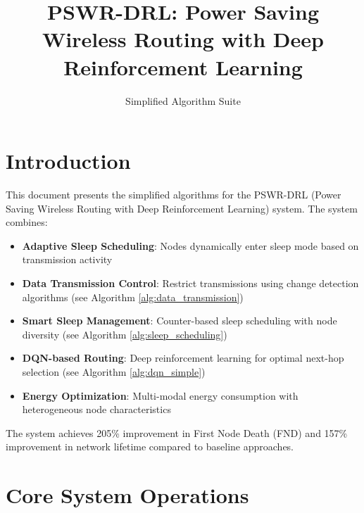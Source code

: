 \documentclass{article}
\begin{document}
\title{PSWR-DRL: Power Saving Wireless Routing with Deep Reinforcement Learning}
\author{Simplified Algorithm Suite}
\maketitle

\section{Introduction}

This document presents the simplified algorithms for the PSWR-DRL (Power Saving Wireless Routing with Deep Reinforcement Learning) system. The system combines:

\begin{itemize}
\item \textbf{Adaptive Sleep Scheduling}: Nodes dynamically enter sleep mode based on transmission activity
\item \textbf{Data Transmission Control}: Restrict transmissions using change detection algorithms (see Algorithm \ref{alg:data_transmission})
\item \textbf{Smart Sleep Management}: Counter-based sleep scheduling with node diversity (see Algorithm \ref{alg:sleep_scheduling})
\item \textbf{DQN-based Routing}: Deep reinforcement learning for optimal next-hop selection (see Algorithm \ref{alg:dqn_simple})
\item \textbf{Energy Optimization}: Multi-modal energy consumption with heterogeneous node characteristics
\end{itemize}

The system achieves 205\% improvement in First Node Death (FND) and 157\% improvement in network lifetime compared to baseline approaches.

\section{Core System Operations}
\end{document}
